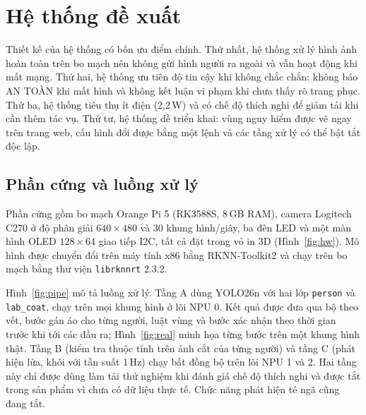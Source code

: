 \documentclass[11pt,a4paper,twocolumn]{article}
\begin{document}
\section{Hệ thống đề xuất}

Thiết kế của hệ thống có bốn ưu điểm chính. Thứ nhất, hệ thống xử lý hình ảnh hoàn toàn trên bo mạch nên không gửi hình người ra ngoài và vẫn hoạt động khi mất mạng. Thứ hai, hệ thống ưu tiên
độ tin cậy khi không chắc chắn: không báo AN TOÀN khi mất hình và không kết luận vi phạm khi chưa thấy rõ trang phục. Thứ ba, hệ thống tiêu thụ ít điện (2,2\,W) và có chế độ thích nghi để giảm tải khi
cần thêm tác vụ. Thứ tư, hệ thống dễ triển khai: vùng nguy hiểm được vẽ ngay trên trang web, cấu hình đổi được bằng một lệnh và các tầng xử lý có thể bật tắt độc lập.

\subsection{Phần cứng và luồng xử lý}

Phần cứng gồm bo mạch Orange Pi 5 (RK3588S, 8\,GB RAM), camera Logitech C270 ở độ phân giải $640{\times}480$ và 30 khung hình/giây, ba đèn LED và một màn hình OLED
$128{\times}64$ giao tiếp I2C, tất cả đặt trong vỏ in 3D (Hình~\ref{fig:hw}). Mô hình được chuyển đổi trên máy tính x86 bằng RKNN-Toolkit2 \cite{rknn} và chạy trên bo mạch bằng
thư viện \texttt{librknnrt} 2.3.2.

Hình~\ref{fig:pipe} mô tả luồng xử lý. Tầng A dùng YOLO26n \cite{yolo} với hai lớp \texttt{person} và \texttt{lab\_coat}, chạy trên mọi khung hình ở lõi NPU 0. Kết quả được đưa qua
bộ theo vết, bước gán áo cho từng người, luật vùng và bước xác nhận theo thời gian trước khi tới các đầu ra; Hình~\ref{fig:real} minh họa từng bước trên một khung hình thật.
Tầng B (kiểm tra thuộc tính trên ảnh cắt của từng người) và tầng C (phát hiện lửa, khói với tần suất 1\,Hz) chạy bất đồng bộ trên lõi NPU 1 và 2. Hai tầng này chỉ được dùng làm
tải thử nghiệm khi đánh giá chế độ thích nghi và được tắt trong sản phẩm vì chưa có dữ liệu thực tế. Chức năng phát hiện té ngã cũng đang tắt.
\end{document}
